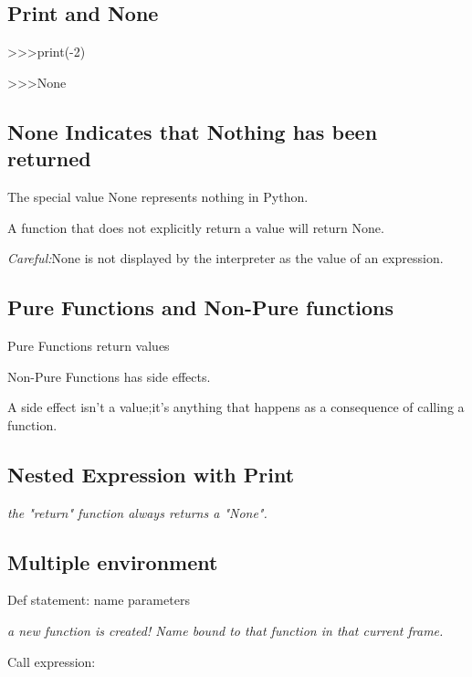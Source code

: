 \documentclass{article}
\begin{document}
\subsection{Print and None}
>>>print(-2)\par 
>>>None \par 
\subsection{None Indicates that Nothing has been returned}
The special value None represents nothing in Python.\par 
A function that does not explicitly return a value will return None.\par 
\emph{Careful:}None is not displayed by the interpreter as the value of an expression.\par 
\subsection{Pure Functions and Non-Pure functions}
Pure Functions return values\par 
Non-Pure Functions has side effects.\par 
A side effect isn't a value;it's anything that happens as a consequence of calling a function.\par 
\subsection{Nested Expression with Print}
\emph{the "return" function always returns a "None".}\par 
\subsection{Multiple environment}
Def statement: name parameters \par 
\emph{a new function is created! Name bound to that function in that current frame.}\par 
Call expression:
\end{document}
